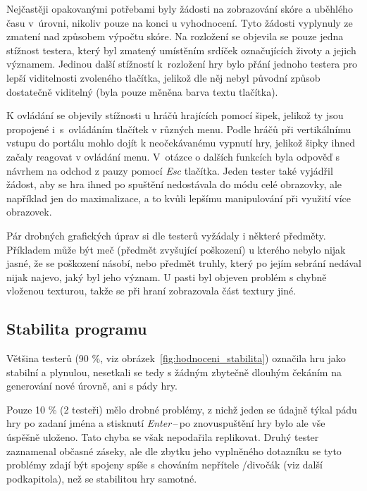 Nejčastěji opakovanými potřebami byly žádosti na zobrazování skóre a uběhlého času v~úrovni, nikoliv pouze na konci u vyhodnocení. Tyto žádosti vyplynuly ze zmatení nad způsobem výpočtu skóre. Na rozložení se objevila se pouze jedna stížnost testera, který byl zmatený umístěním srdíček označujících životy a jejich významem. Jedinou další stížností k~rozložení hry bylo přání jednoho testera pro lepší viditelnosti zvoleného tlačítka, jelikož dle něj nebyl původní způsob dostatečně viditelný (byla pouze měněna barva textu tlačítka).

K ovládání se objevily stížnosti u hráčů hrajících pomocí šipek, jelikož ty jsou propojené i~s~ovládáním tlačítek v různých menu. Podle hráčů při vertikálnímu vstupu do portálu mohlo dojít k neočekávanému vypnutí hry, jelikož šipky ihned začaly reagovat v ovládání menu. V~otázce o dalších funkcích byla odpověď s návrhem na odchod z pauzy pomocí \textit{Esc} tlačítka. Jeden tester také vyjádřil žádost, aby se hra ihned po spuštění nedostávala do módu celé obrazovky, ale například jen do maximalizace, a to kvůli lepšímu manipulování při využití více obrazovek.

Pár drobných grafických úprav si dle testerů vyžádaly i některé předměty. Příkladem může být meč (předmět zvyšující poškození) u kterého nebylo nijak jasné, že se poškození násobí, nebo předmět truhly, který po jejím sebrání nedával nijak najevo, jaký byl jeho význam. U pasti byl objeven problém s chybně vloženou texturou, takže se při hraní zobrazovala část textury jiné.

\subsection*{Stabilita programu}
Většina testerů (90 \%, viz obrázek~\ref{fig:hodnoceni_stabilita}) označila hru jako stabilní a plynulou, nesetkali se tedy s žádným zbytečně dlouhým čekáním na generování nové úrovně, ani s pády hry.

Pouze 10 \% (2 testeři) mělo drobné problémy, z nichž jeden se údajně týkal pádu hry po zadaní jména a stisknutí \textit{Enter}\,--\,po znovuspuštění hry bylo ale vše úspěšně uloženo. Tato chyba se však nepodařila replikovat. Druhý tester zaznamenal občasné záseky, ale dle zbytku jeho vyplněného dotazníku se tyto problémy zdají být spojeny spíše s chováním nepřítele /divočák (viz další podkapitola), než se stabilitou hry samotné.\\

